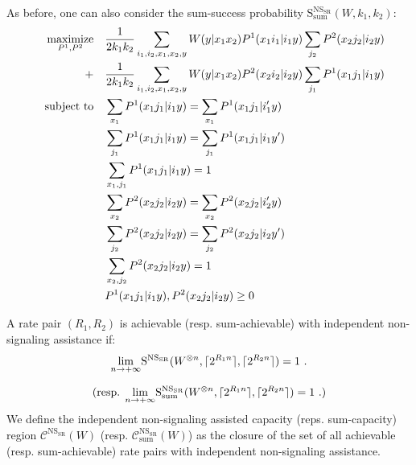 As before, one can also consider the sum-success probability $\mathrm{S}_{\text{sum}}^{\mathrm{NS}_{\mathrm{SR}}}(W,k_1,k_2)$:
\begin{equation}
  \begin{aligned}
    &&\underset{P^1, P^2}{\operatorname{\text{maximize}}} &&& \frac{1}{2k_1k_2} \sum_{i_1,i_2,x_1,x_2,y} W(y|x_1x_2)P^1(x_1i_1|i_1y)\sum_{j_2}P^2(x_2j_2|i_2y)\\
    &&+&&& \frac{1}{2k_1k_2} \sum_{i_1,i_2,x_1,x_2,y} W(y|x_1x_2)P^2(x_2i_2|i_2y)\sum_{j_1}P^1(x_1j_1|i_1y)\\
    &&\operatorname{\text{subject to}} &&& \sum_{x_1} P^1(x_1j_1|i_1y) = \sum_{x_1} P^1(x_1j_1|i_1'y)\\
    &&&&& \sum_{j_1} P^1(x_1j_1|i_1y) = \sum_{j_1} P^1(x_1j_1|i_1y')\\
    &&&&& \sum_{x_1,j_1} P^1(x_1j_1|i_1y) = 1\\
    &&&&& \sum_{x_2} P^2(x_2j_2|i_2y) = \sum_{x_2} P^2(x_2j_2|i_2'y)\\
    &&&&& \sum_{j_2} P^2(x_2j_2|i_2y) = \sum_{j_2} P^2(x_2j_2|i_2y')\\
    &&&&& \sum_{x_2,j_2} P^2(x_2j_2|i_2y) = 1\\
    &&&&& P^1(x_1j_1|i_1y), P^2(x_2j_2|i_2y) \geq 0
  \end{aligned}
\end{equation}

\begin{definition}
  A rate pair $(R_1,R_2)$ is achievable (resp. sum-achievable) with independent non-signaling assistance if:
  \[ \underset{n \rightarrow +\infty}{\lim} \mathrm{S}^{\mathrm{NS}_{\mathrm{SR}}}(W^{\otimes n},\lceil2^{R_1n}\rceil,\lceil2^{R_2n}\rceil) = 1 \ . \]

   \[ (\text{resp. }\underset{n \rightarrow +\infty}{\lim} \mathrm{S}_{\text{sum}}^{\mathrm{NS}_{\mathrm{SR}}}(W^{\otimes n},\lceil2^{R_1n}\rceil,\lceil2^{R_2n}\rceil) = 1 \ .) \]
  We define the independent non-signaling assisted capacity (reps. sum-capacity) region $\mathcal{C}^{\mathrm{NS}_{\mathrm{SR}}}(W)$ (resp. $\mathcal{C}_{\text{sum}}^{\mathrm{NS}_{\mathrm{SR}}}(W)$) as the closure of the set of all achievable (resp. sum-achievable) rate pairs with independent non-signaling assistance.
\end{definition}

